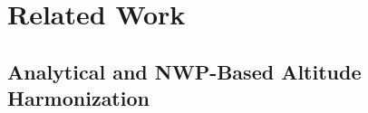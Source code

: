 \section{Related Work}
\label{sec:related_work}

\subsection{Analytical and NWP-Based Altitude Harmonization}




